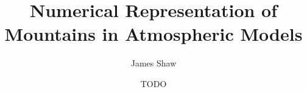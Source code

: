 \documentclass[a4paper,oneside]{memoir}
\title{Numerical Representation of Mountains in Atmospheric Models}
\author{James Shaw}
\date{TODO}
\begin{document}
\newcommand{\TODO}[1]{\textcolor{purple}{TODO: \emph{#1}}}


\frontmatter
\thispagestyle{plain}
\null\vfil
\begin{abstract}
\blindtext
\end{abstract}
\vfil

\cleardoublepage
\tableofcontents*

\mainmatter

\backmatter


\end{document}
